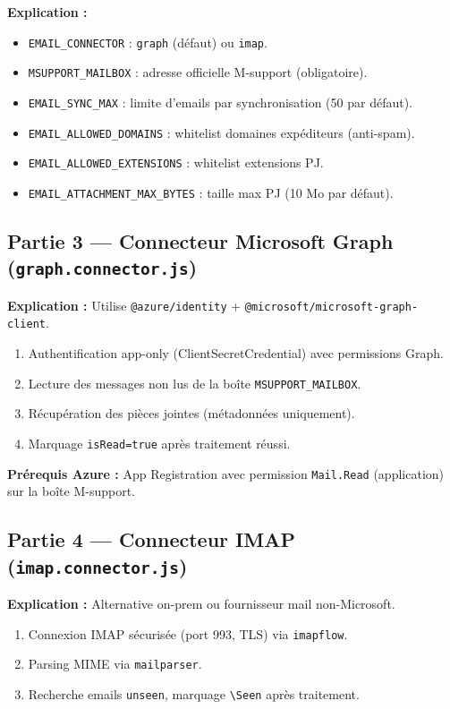 \documentclass[12pt,a4paper]{article}
\begin{document}
\textbf{Explication :}

\begin{itemize}
  \item \texttt{EMAIL\_CONNECTOR} : \texttt{graph} (défaut) ou \texttt{imap}.
  \item \texttt{MSUPPORT\_MAILBOX} : adresse officielle M-support (obligatoire).
  \item \texttt{EMAIL\_SYNC\_MAX} : limite d'emails par synchronisation (50 par défaut).
  \item \texttt{EMAIL\_ALLOWED\_DOMAINS} : whitelist domaines expéditeurs (anti-spam).
  \item \texttt{EMAIL\_ALLOWED\_EXTENSIONS} : whitelist extensions PJ.
  \item \texttt{EMAIL\_ATTACHMENT\_MAX\_BYTES} : taille max PJ (10 Mo par défaut).
\end{itemize}

\subsection{Partie 3 --- Connecteur Microsoft Graph (\texttt{graph.connector.js})}

\textbf{Explication :} Utilise \texttt{@azure/identity} + \texttt{@microsoft/microsoft-graph-client}.

\begin{enumerate}
  \item Authentification app-only (ClientSecretCredential) avec permissions Graph.
  \item Lecture des messages non lus de la boîte \texttt{MSUPPORT\_MAILBOX}.
  \item Récupération des pièces jointes (métadonnées uniquement).
  \item Marquage \texttt{isRead=true} après traitement réussi.
\end{enumerate}

\textbf{Prérequis Azure :} App Registration avec permission \texttt{Mail.Read} (application) sur la boîte M-support.

\subsection{Partie 4 --- Connecteur IMAP (\texttt{imap.connector.js})}

\textbf{Explication :} Alternative on-prem ou fournisseur mail non-Microsoft.

\begin{enumerate}
  \item Connexion IMAP sécurisée (port 993, TLS) via \texttt{imapflow}.
  \item Parsing MIME via \texttt{mailparser}.
  \item Recherche emails \texttt{unseen}, marquage \texttt{\textbackslash Seen} après traitement.
\end{enumerate}
\end{document}
